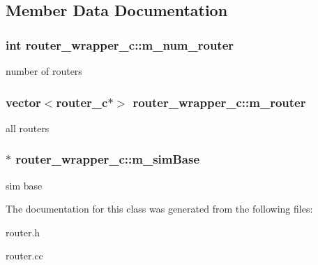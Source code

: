 \subsection{Member Data Documentation}
\hypertarget{classrouter__wrapper__c_a1fe3154cc128d3550603cce234362dea}{
\subsubsection[{m\_\-num\_\-router}]{\setlength{\rightskip}{0pt plus 5cm}int {\bf router\_\-wrapper\_\-c::m\_\-num\_\-router}}}
\label{classrouter__wrapper__c_a1fe3154cc128d3550603cce234362dea}
number of routers \hypertarget{classrouter__wrapper__c_a98f6fc4d587dd868a4b3849930d32271}{
\subsubsection[{m\_\-router}]{\setlength{\rightskip}{0pt plus 5cm}vector$<${\bf router\_\-c}$\ast$$>$ {\bf router\_\-wrapper\_\-c::m\_\-router}}}
\label{classrouter__wrapper__c_a98f6fc4d587dd868a4b3849930d32271}
all routers \hypertarget{classrouter__wrapper__c_a7f34c887818e7073d5ae17acc0ce4461}{
\subsubsection[{m\_\-simBase}]{$\ast$ {\bf router\_\-wrapper\_\-c::m\_\-simBase}}}
\label{classrouter__wrapper__c_a7f34c887818e7073d5ae17acc0ce4461}
sim base 

The documentation for this class was generated from the following files:\begin{DoxyCompactItemize}
\item 
router.h\item 
router.cc\end{DoxyCompactItemize}

